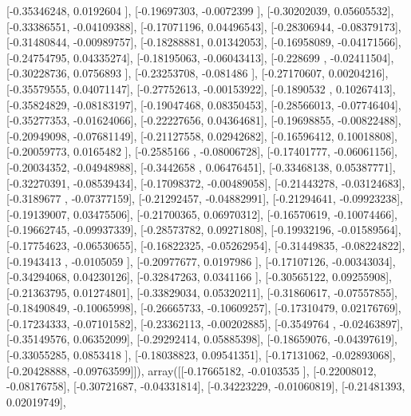 \documentclass{article}
\begin{document}
       [-0.35346248,  0.0192604 ],
       [-0.19697303, -0.0072399 ],
       [-0.30202039,  0.05605532],
       [-0.33386551, -0.04109388],
       [-0.17071196,  0.04496543],
       [-0.28306944, -0.08379173],
       [-0.31480844, -0.00989757],
       [-0.18288881,  0.01342053],
       [-0.16958089, -0.04171566],
       [-0.24754795,  0.04335274],
       [-0.18195063, -0.06043413],
       [-0.228699  , -0.02411504],
       [-0.30228736,  0.0756893 ],
       [-0.23253708, -0.081486  ],
       [-0.27170607,  0.00204216],
       [-0.35579555,  0.04071147],
       [-0.27752613, -0.00153922],
       [-0.1890532 ,  0.10267413],
       [-0.35824829, -0.08183197],
       [-0.19047468,  0.08350453],
       [-0.28566013, -0.07746404],
       [-0.35277353, -0.01624066],
       [-0.22227656,  0.04364681],
       [-0.19698855, -0.00822488],
       [-0.20949098, -0.07681149],
       [-0.21127558,  0.02942682],
       [-0.16596412,  0.10018808],
       [-0.20059773,  0.0165482 ],
       [-0.2585166 , -0.08006728],
       [-0.17401777, -0.06061156],
       [-0.20034352, -0.04948988],
       [-0.3442658 ,  0.06476451],
       [-0.33468138,  0.05387771],
       [-0.32270391, -0.08539434],
       [-0.17098372, -0.00489058],
       [-0.21443278, -0.03124683],
       [-0.3189677 , -0.07377159],
       [-0.21292457, -0.04882991],
       [-0.21294641, -0.09923238],
       [-0.19139007,  0.03475506],
       [-0.21700365,  0.06970312],
       [-0.16570619, -0.10074466],
       [-0.19662745, -0.09937339],
       [-0.28573782,  0.09271808],
       [-0.19932196, -0.01589564],
       [-0.17754623, -0.06530655],
       [-0.16822325, -0.05262954],
       [-0.31449835, -0.08224822],
       [-0.1943413 , -0.0105059 ],
       [-0.20977677,  0.0197986 ],
       [-0.17107126, -0.00343034],
       [-0.34294068,  0.04230126],
       [-0.32847263,  0.0341166 ],
       [-0.30565122,  0.09255908],
       [-0.21363795,  0.01274801],
       [-0.33829034,  0.05320211],
       [-0.31860617, -0.07557855],
       [-0.18490849, -0.10065998],
       [-0.26665733, -0.10609257],
       [-0.17310479,  0.02176769],
       [-0.17234333, -0.07101582],
       [-0.23362113, -0.00202885],
       [-0.3549764 , -0.02463897],
       [-0.35149576,  0.06352099],
       [-0.29292414,  0.05885398],
       [-0.18659076, -0.04397619],
       [-0.33055285,  0.0853418 ],
       [-0.18038823,  0.09541351],
       [-0.17131062, -0.02893068],
       [-0.20428888, -0.09763599]]), array([[-0.17665182, -0.0103535 ],
       [-0.22008012, -0.08176758],
       [-0.30721687, -0.04331814],
       [-0.34223229, -0.01060819],
       [-0.21481393,  0.02019749],
\end{document}
